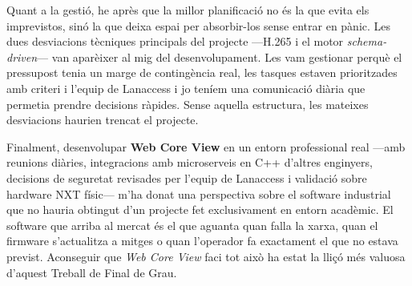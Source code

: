 Quant a la gestió, he après que la millor planificació no és la que evita els imprevistos, sinó la que deixa espai per absorbir-los sense entrar en pànic. Les dues desviacions tècniques principals del projecte —H.265 i el motor \textit{schema-driven}— van aparèixer al mig del desenvolupament. Les vam gestionar perquè el pressupost tenia un marge de contingència real, les tasques estaven prioritzades amb criteri i l'equip de Lanaccess i jo teníem una comunicació diària que permetia prendre decisions ràpides. Sense aquella estructura, les mateixes desviacions haurien trencat el projecte.

Finalment, desenvolupar \textbf{Web Core View} en un entorn professional real —amb reunions diàries, integracions amb microserveis en C++ d'altres enginyers, decisions de seguretat revisades per l'equip de Lanaccess i validació sobre hardware NXT físic— m'ha donat una perspectiva sobre el software industrial que no hauria obtingut d'un projecte fet exclusivament en entorn acadèmic. El software que arriba al mercat és el que aguanta quan falla la xarxa, quan el firmware s'actualitza a mitges o quan l'operador fa exactament el que no estava previst. Aconseguir que \textit{Web Core View} faci tot això ha estat la lliçó més valuosa d'aquest Treball de Final de Grau.